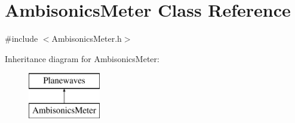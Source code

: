 \hypertarget{class_ambisonics_meter}{\section{Ambisonics\-Meter Class Reference}
\label{class_ambisonics_meter}
}


{\ttfamily \#include $<$Ambisonics\-Meter.\-h$>$}

Inheritance diagram for Ambisonics\-Meter\-:\begin{figure}[H]
\begin{center}
\leavevmode
\includegraphics[height=2.000000cm]{class_ambisonics_meter}
\end{center}
\end{figure}
